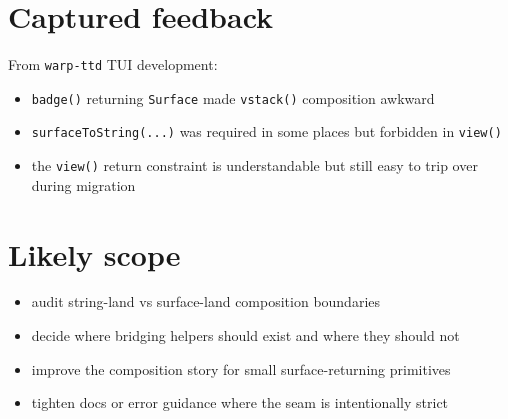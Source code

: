 \section{Captured feedback}\label{record-303-captured-feedback}

From \texttt{w\allowbreak{}a\allowbreak{}r\allowbreak{}p\allowbreak{}-\allowbreak{}t\allowbreak{}t\allowbreak{}d} TUI development:

\begin{itemize}
\tightlist
\item
  \texttt{b\allowbreak{}a\allowbreak{}d\allowbreak{}g\allowbreak{}e\allowbreak{}(\allowbreak{})} returning \texttt{S\allowbreak{}u\allowbreak{}r\allowbreak{}f\allowbreak{}a\allowbreak{}c\allowbreak{}e} made \texttt{v\allowbreak{}s\allowbreak{}t\allowbreak{}a\allowbreak{}c\allowbreak{}k\allowbreak{}(\allowbreak{})} composition awkward
\item
  \texttt{s\allowbreak{}u\allowbreak{}r\allowbreak{}f\allowbreak{}a\allowbreak{}c\allowbreak{}e\allowbreak{}T\allowbreak{}o\allowbreak{}S\allowbreak{}t\allowbreak{}r\allowbreak{}i\allowbreak{}n\allowbreak{}g\allowbreak{}(\allowbreak{}.\allowbreak{}.\allowbreak{}.\allowbreak{})} was required in some places but forbidden in \texttt{v\allowbreak{}i\allowbreak{}e\allowbreak{}w\allowbreak{}(\allowbreak{})}
\item
  the \texttt{v\allowbreak{}i\allowbreak{}e\allowbreak{}w\allowbreak{}(\allowbreak{})} return constraint is understandable but still easy to trip over during migration
\end{itemize}

\section{Likely scope}\label{record-303-likely-scope}

\begin{itemize}
\tightlist
\item
  audit string-land vs surface-land composition boundaries
\item
  decide where bridging helpers should exist and where they should not
\item
  improve the composition story for small surface-returning primitives
\item
  tighten docs or error guidance where the seam is intentionally strict
\end{itemize}

